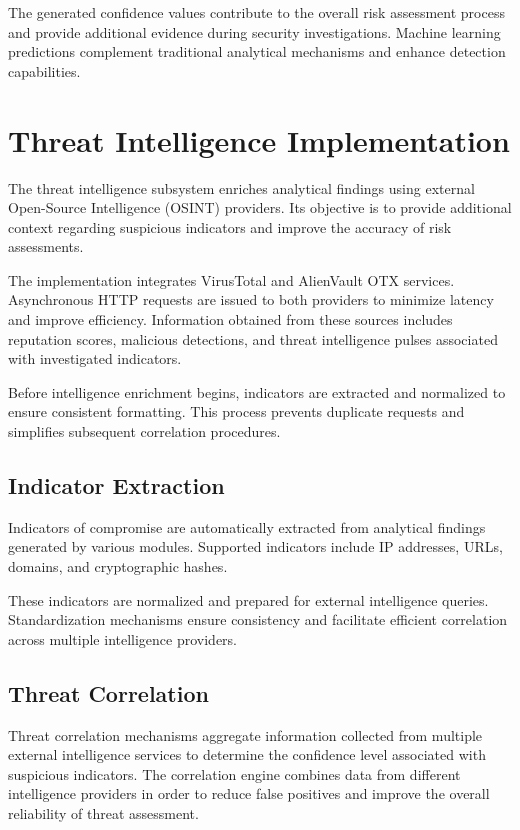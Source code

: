 The generated confidence values contribute to the overall risk assessment process and provide additional evidence during security investigations. Machine learning predictions complement traditional analytical mechanisms and enhance detection capabilities.

\section{Threat Intelligence Implementation}
The threat intelligence subsystem enriches analytical findings using external Open-Source Intelligence (OSINT) providers. Its objective is to provide additional context regarding suspicious indicators and improve the accuracy of risk assessments.

The implementation integrates VirusTotal and AlienVault OTX services. Asynchronous HTTP requests are issued to both providers to minimize latency and improve efficiency. Information obtained from these sources includes reputation scores, malicious detections, and threat intelligence pulses associated with investigated indicators.

Before intelligence enrichment begins, indicators are extracted and normalized to ensure consistent formatting. This process prevents duplicate requests and simplifies subsequent correlation procedures.

\subsection{Indicator Extraction}
Indicators of compromise are automatically extracted from analytical findings generated by various modules. Supported indicators include IP addresses, URLs, domains, and cryptographic hashes.

These indicators are normalized and prepared for external intelligence queries. Standardization mechanisms ensure consistency and facilitate efficient correlation across multiple intelligence providers.

\subsection{Threat Correlation}
Threat correlation mechanisms aggregate information collected from multiple external intelligence services to determine the confidence level associated with suspicious indicators. The correlation engine combines data from different intelligence providers in order to reduce false positives and improve the overall reliability of threat assessment.

